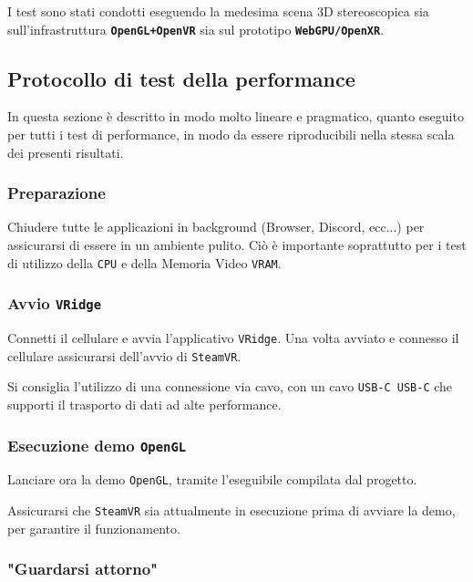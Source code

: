 \documentclass[a4paper, 11pt, twoside]{report}
\begin{document}
I test sono stati condotti eseguendo la medesima scena 3D stereoscopica sia sull'infrastruttura
\textcolor{blue!40}{\textbf{\texttt{OpenGL+OpenVR}}} sia sul prototipo \textcolor{violet!75}{\textbf{\texttt{WebGPU/OpenXR}}}.

\subsection{Protocollo di test della performance}

In questa sezione è descritto in modo molto lineare e pragmatico, quanto eseguito per tutti i test di performance, in
modo da essere riproducibili nella stessa scala dei presenti risultati.

\subsubsection{Preparazione}

Chiudere tutte le applicazioni in background (Browser, Discord, ecc...) per assicurarsi di essere in un ambiente pulito.
Ciò è importante soprattutto per i test di utilizzo della \texttt{CPU} e della Memoria Video \texttt{VRAM}.

\subsubsection{Avvio \texttt{VRidge}}

Connetti il cellulare e avvia l'applicativo \texttt{VRidge}. Una volta avviato e connesso il cellulare assicurarsi
dell'avvio di \texttt{SteamVR}.

Si consiglia l'utilizzo di una connessione via cavo, con un cavo \texttt{USB-C USB-C} che supporti il trasporto di dati
ad alte performance.

\subsubsection{Esecuzione demo \texttt{OpenGL}}

Lanciare ora la demo \texttt{OpenGL}, tramite l'eseguibile compilata dal progetto.

Assicurarsi che \texttt{SteamVR} sia attualmente in esecuzione prima di avviare la demo, per garantire il funzionamento.

\subsubsection{"Guardarsi attorno"}\label{a3:lookaround}
\end{document}
